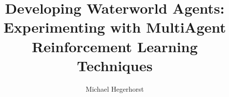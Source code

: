 \documentclass[conference, 12pt]{IEEEtran}
\begin{document}
%
    \title{
        Developing Waterworld Agents:\\
        Experimenting with MultiAgent Reinforcement Learning Techniques
    }
%
%
%

    \author{Michael Hegerhorst}

%
%


%


\end{document}
